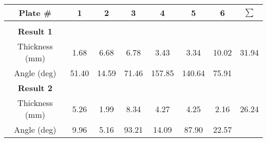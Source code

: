 \documentclass{standalone}
\begin{document}
    \begin{tabular}{c c c c c c c c}
        \toprule
        Plate \# & 1 & 2 & 3 & 4 & 5 & 6 & $\sum$ \\ 
        \midrule\\
        \textbf{Result 1}\\
        \addlinespace[1.5ex]
        Thickness (\si{\milli \meter}) & 1.68 & 6.68 & 6.78 & 3.43 & 3.34 & 10.02 & 31.94\\
        \addlinespace[1.5ex]
        Angle (deg) & 51.40 & 14.59 & 71.46 & 157.85 & 140.64 & 75.91 \\
        \bottomrule
        \addlinespace[1.5ex]
        \textbf{Result 2}\\
        \addlinespace[1ex]
        Thickness (\si{\milli \meter}) & 5.26 & 1.99 & 8.34 & 4.27 & 4.25 & 2.16 & 26.24\\
        \addlinespace[1.5ex]
        Angle (deg) & 9.96 & 5.16 & 93.21 & 14.09 & 87.90 & 22.57 \\
        \bottomrule
    \end{tabular}
\end{document}
